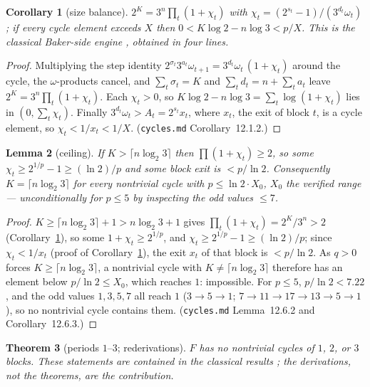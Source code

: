 \documentclass[11pt]{article}
\newtheorem{theorem}{Theorem}[section]
\newtheorem{lemma}[theorem]{Lemma}
\newtheorem{corollary}[theorem]{Corollary}
\theoremstyle{remark}
\newcommand{\w}{\omega}
\newcommand{\LL}{\log_2 3}
\begin{document}
\begin{corollary}[size balance]\label{cor:size}
$2^K = 3^n \prod_t (1 + \chi_t)$ with $\chi_t = (2^{s_t}-1)/(3^{d_t}\w_t)$; if every cycle element exceeds $X$ then $0 < K\log 2 - n\log 3 < p/X$. This is the classical Baker-side engine \cite{eliahou}, obtained in four lines.
\end{corollary}

\begin{proof}
Multiplying the step identity $2^{\sigma_t}3^{a_t}\w_{t+1} = 3^{d_t}\w_t\,(1 + \chi_t)$ around the cycle, the $\w$-products cancel, and $\sum_t \sigma_t = K$ and $\sum_t d_t = n + \sum_t a_t$ leave $2^K = 3^n\prod_t(1+\chi_t)$. Each $\chi_t > 0$, so $K\log 2 - n\log 3 = \sum_t \log(1 + \chi_t)$ lies in $(0, \sum_t \chi_t)$. Finally $3^{d_t}\w_t > A_t = 2^{s_t}x_t$, where $x_t$, the exit of block $t$, is a cycle element, so $\chi_t < 1/x_t < 1/X$. (\texttt{cycles.md} Corollary~12.1.2.)
\end{proof}

\begin{lemma}[ceiling]\label{lem:ceiling}
If $K > \lceil n\LL \rceil$ then $\prod(1+\chi_t) \ge 2$, so some $\chi_t \ge 2^{1/p}-1 \ge (\ln 2)/p$ and some block exit is $< p/\ln 2$. Consequently $K = \lceil n \LL\rceil$ for every nontrivial cycle with $p \le \ln 2 \cdot X_0$, $X_0$ the verified range \cite{barina} --- unconditionally for $p\le5$ by inspecting the odd values $\le 7$.
\end{lemma}

\begin{proof}
$K \ge \lceil n\LL\rceil + 1 > n\LL + 1$ gives $\prod_t(1 + \chi_t) = 2^K/3^n > 2$ (Corollary~\ref{cor:size}), so some $1 + \chi_t \ge 2^{1/p}$, and $\chi_t \ge 2^{1/p} - 1 \ge (\ln 2)/p$; since $\chi_t < 1/x_t$ (proof of Corollary~\ref{cor:size}), the exit $x_t$ of that block is $< p/\ln 2$. As $q > 0$ forces $K \ge \lceil n\LL\rceil$, a nontrivial cycle with $K \ne \lceil n\LL\rceil$ therefore has an element below $p/\ln 2 \le X_0$, which reaches $1$: impossible. For $p \le 5$, $p/\ln 2 < 7.22$, and the odd values $1, 3, 5, 7$ all reach $1$ ($3 \to 5 \to 1$; $7 \to 11 \to 17 \to 13 \to 5 \to 1$), so no nontrivial cycle contains them. (\texttt{cycles.md} Lemma~12.6.2 and Corollary~12.6.3.)
\end{proof}

\begin{theorem}[periods $1$--$3$; rederivations]\label{thm:smallp}
$F$ has no nontrivial cycles of $1$, $2$, or $3$ blocks. These statements are contained in the classical results \cite{steiner,rozier90,sdw,hercher}; the derivations, not the theorems, are the contribution.
\end{theorem}
\end{document}
